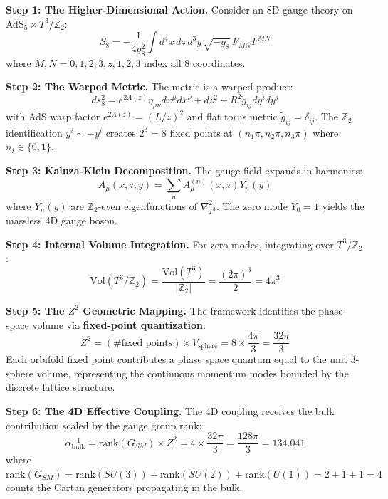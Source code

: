 \documentclass[12pt,a4paper]{article}
\newcommand{\Ztwo}{\mathbb{Z}_2}
\newcommand{\Tthree}{T^3}
\newcommand{\Zsq}{Z^2}
\begin{document}
\textbf{Step 1: The Higher-Dimensional Action.}
Consider an 8D gauge theory on AdS$_5 \times \Tthree/\Ztwo$:
\begin{equation}
S_8 = -\frac{1}{4g_8^2} \int d^4x\, dz\, d^3y\, \sqrt{-g_8}\, F_{MN}F^{MN}
\end{equation}
where $M, N = 0,1,2,3,z,1,2,3$ index all 8 coordinates.

\textbf{Step 2: The Warped Metric.}
The metric is a warped product:
\begin{equation}
ds_8^2 = e^{2A(z)} \eta_{\mu\nu} dx^\mu dx^\nu + dz^2 + R^2 \tilde{g}_{ij} dy^i dy^j
\end{equation}
with AdS warp factor $e^{2A(z)} = (L/z)^2$ and flat torus metric $\tilde{g}_{ij} = \delta_{ij}$. The $\Ztwo$ identification $y^i \sim -y^i$ creates $2^3 = 8$ fixed points at $(n_1\pi, n_2\pi, n_3\pi)$ where $n_i \in \{0,1\}$.

\textbf{Step 3: Kaluza-Klein Decomposition.}
The gauge field expands in harmonics:
\begin{equation}
A_\mu(x,z,y) = \sum_n A_\mu^{(n)}(x,z) Y_n(y)
\end{equation}
where $Y_n(y)$ are $\Ztwo$-even eigenfunctions of $\nabla^2_{T^3}$. The zero mode $Y_0 = 1$ yields the massless 4D gauge boson.

\textbf{Step 4: Internal Volume Integration.}
For zero modes, integrating over $\Tthree/\Ztwo$:
\begin{equation}
\text{Vol}(\Tthree/\Ztwo) = \frac{\text{Vol}(T^3)}{|\Ztwo|} = \frac{(2\pi)^3}{2} = 4\pi^3
\end{equation}

\textbf{Step 5: The $\Zsq$ Geometric Mapping.}
The framework identifies the phase space volume via \textbf{fixed-point quantization}:
\begin{equation}
\Zsq = (\text{\# fixed points}) \times V_{\text{sphere}} = 8 \times \frac{4\pi}{3} = \frac{32\pi}{3}
\end{equation}
Each orbifold fixed point contributes a phase space quantum equal to the unit 3-sphere volume, representing the continuous momentum modes bounded by the discrete lattice structure.

\textbf{Step 6: The 4D Effective Coupling.}
The 4D coupling receives the bulk contribution scaled by the gauge group rank:
\begin{equation}
\alpha_{\text{bulk}}^{-1} = \text{rank}(G_{SM}) \times \Zsq = 4 \times \frac{32\pi}{3} = \frac{128\pi}{3} = 134.041
\end{equation}
where $\text{rank}(G_{SM}) = \text{rank}(SU(3)) + \text{rank}(SU(2)) + \text{rank}(U(1)) = 2 + 1 + 1 = 4$ counts the Cartan generators propagating in the bulk.
\end{document}
